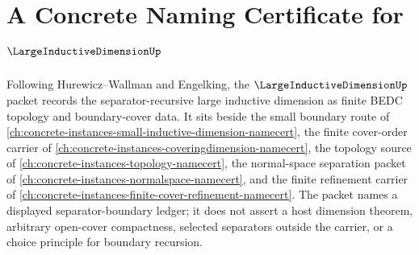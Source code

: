 \chapter{A Concrete Naming Certificate for $\LargeInductiveDimensionUp$}
\label{ch:concrete-instances-large-inductive-dimension-namecert}

Following Hurewicz--Wallman and Engelking, the $\LargeInductiveDimensionUp$ packet records the separator-recursive large inductive dimension as finite BEDC topology and boundary-cover data. It sits beside the small boundary route of \autoref{ch:concrete-instances-small-inductive-dimension-namecert}, the finite cover-order carrier of \autoref{ch:concrete-instances-coveringdimension-namecert}, the topology source of \autoref{ch:concrete-instances-topology-namecert}, the normal-space separation packet of \autoref{ch:concrete-instances-normalspace-namecert}, and the finite refinement carrier of \autoref{ch:concrete-instances-finite-cover-refinement-namecert}. The packet names a displayed separator-boundary ledger; it does not assert a host dimension theorem, arbitrary open-cover compactness, selected separators outside the carrier, or a choice principle for boundary recursion.

